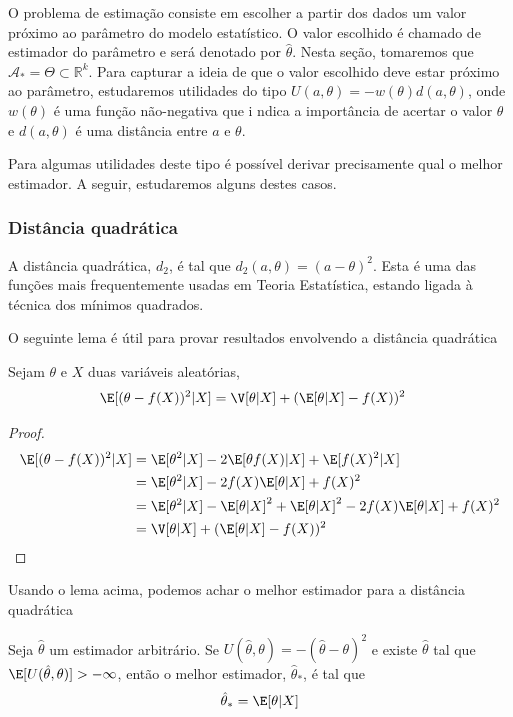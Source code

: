 O problema de estimação consiste em 
escolher a partir dos dados 
um valor próximo ao parâmetro do modelo estatístico.
O valor escolhido é chamado de estimador do parâmetro e
será denotado por $\hat{\theta}$.
Nesta seção, tomaremos que 
$\mathcal{A}_{*} = \Theta \subset \mathbb{R}^{k}$.
Para capturar a ideia de que
o valor escolhido deve estar próximo ao parâmetro,
estudaremos utilidades do tipo 
$U(a,\theta) = -w(\theta)d(a,\theta)$,
onde $w(\theta)$ é uma função não-negativa que i
ndica a importância de acertar o valor $\theta$ e
$d(a,\theta)$ é uma distância entre $a$ e $\theta$.

Para algumas utilidades deste tipo é possível derivar
precisamente qual o melhor estimador.
A seguir, estudaremos alguns destes casos.

\subsubsection{Distância quadrática}

A distância quadrática, $d_{2}$, 
é tal que $d_{2}(a,\theta) = (a-\theta)^{2}$.
Esta é uma das funções mais frequentemente usadas 
em Teoria Estatística,
estando ligada à técnica dos mínimos quadrados.

O seguinte lema é útil para 
provar resultados envolvendo 
a distância quadrática
\begin{lemma}
 \label{lemma:conditional_l2}
 Sejam $\theta$ e $X$ 
 duas variáveis aleatórias,
 \begin{align*}
  \E[(\theta-f(X))^{2}|X]
  &= \V[\theta|X] + (\E[\theta|X]-f(X))^{2}
 \end{align*}
\end{lemma}
\begin{proof}
 \begin{align*}
  \E[(\theta-f(X))^{2}|X]
  &= \E[\theta^{2}|X] 
  -2\E[\theta f(X)|X] + \E[f(X)^{2}|X] \\
  &= \E[\theta^{2}|X] -2f(X)\E[\theta|X] + f(X)^{2} \\
  &= \E[\theta^{2}|X] -\E[\theta|X]^{2} +\E[\theta|X]^{2} 
  -2f(X)\E[\theta|X] + f(X)^{2}	\\
  &= \V[\theta|X] + (\E[\theta|X]-f(X))^{2}
 \end{align*}
\end{proof}
Usando o lema acima, podemos 
achar o melhor estimador para
a distância quadrática
\begin{theorem}
 \label{thm:estimation_l2}
 Seja $\hat{\theta}$ um estimador arbitrário.
 Se $U(\hat{\theta},\theta) = -(\hat{\theta}-\theta)^{2}$
 e existe $\hat{\theta}$ tal que 
 $\E[U(\hat{\theta},\theta)] > -\infty$,
 então o melhor estimador, $\hat{\theta}_{*}$, 
 é tal que
 \begin{align*}
  \hat{\theta}_{*} = \E[\theta|X]
 \end{align*}
\end{theorem}

